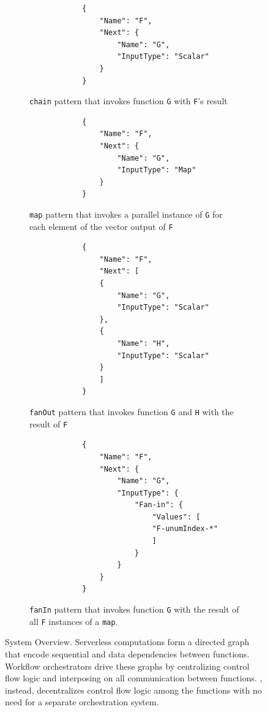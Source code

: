 \begin{figure}[t!]
	\centering
	\begin{subfigure}[t]{\columnwidth}
		\centering
		\begin{verbatim}
			{
				"Name": "F",
				"Next": {
					"Name": "G",
					"InputType": "Scalar"
				}
			}
		\end{verbatim}
		\caption{\texttt{chain} pattern that invokes function \texttt{G} with
			\texttt{F}'s result}
		\label{fig:gadget-examples-chain}
	\end{subfigure}
	\begin{subfigure}[t]{\columnwidth}
		\centering
		\begin{verbatim}
			{
				"Name": "F",
				"Next": {
					"Name": "G",
					"InputType": "Map"
				}
			}
		\end{verbatim}
		\caption{\texttt{map} pattern that invokes a parallel instance of
			\texttt{G} for each element of the vector output of \texttt{F}}
		\label{fig:gadget-examples-map}
	\end{subfigure}
	\hfill
	\begin{subfigure}[t]{\columnwidth}
		\centering
		\begin{verbatim}
			{
				"Name": "F",
				"Next": [
				{
					"Name": "G",
					"InputType": "Scalar"
				},
				{
					"Name": "H",
					"InputType": "Scalar"
				}
				]
			}
		\end{verbatim}
		\caption{\texttt{fanOut} pattern that invokes function \texttt{G} and
			\texttt{H} with the result of \texttt{F}}
		\label{fig:gadget-examples-fanout}
	\end{subfigure}
	\begin{subfigure}[t]{\columnwidth}
		\centering
		\begin{verbatim}
			{
				"Name": "F",
				"Next": {
					"Name": "G",
					"InputType": {
						"Fan-in": {
							"Values": [
							"F-unumIndex-*"
							]
						}
					}
				}
			}
		\end{verbatim}
		\caption{\texttt{fanIn} pattern that invokes function \texttt{G} with
			the result of all \texttt{F} instances of a \texttt{map}.}
		\label{fig:gadget-examples-fanin}
	\end{subfigure}
	\caption{\name{} System Overview. Serverless computations form a directed
		graph that encode sequential and data dependencies between functions. Workflow
		orchestrators drive these graphs by centralizing control flow logic and
		interposing on all communication between functions. \name{},
		instead, decentralizes control flow logic among the functions with
		no need for a separate orchestration system.}
	\label{fig:arch2}
\end{figure}


